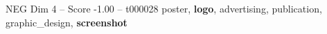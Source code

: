 \begin{textsample}{NEG Dim 4 – Score -1.00 – t000028}  \label{ex:f4_neg_030}
poster, \textbf{logo}, advertising, publication, graphic\_design, \textbf{screenshot}

\end{textsample}
